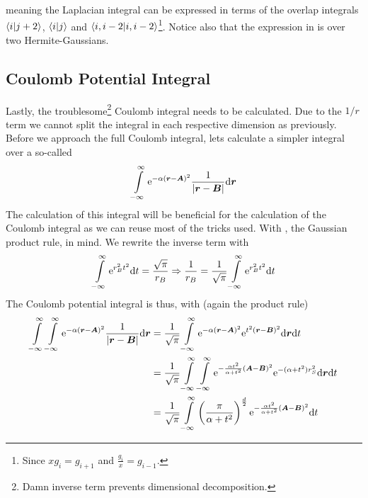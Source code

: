     meaning the Laplacian integral can be expressed in terms of the overlap
    integrals $\braket{i}{j+2}$, $\braket{i}{j}$ and
    $\braket{i,i-2}$\footnote{Since $xg_i=g_{i+1}$ and
    $\frac{g_i}{x}=g_{i-1}$.}. Notice also that the expression in
     is over two Hermite-Gaussians.

\subsection{Coulomb Potential Integral}
    Lastly, the troublesome\footnote{Damn inverse term prevents dimensional
    decomposition.} Coulomb integral needs to be calculated. Due to the $1/r$
    term we cannot split the integral in each respective dimension as
    previously. Before we approach the full Coulomb integral, lets calculate a
    simpler integral over a so-called 
        \begin{equation}
            \int\limits^{\infty}_{-\infty} \mathrm{e}^{-\alpha\left(\boldsymbol{{r}} - \boldsymbol{{A}}\right)^2}
            \frac{1}{\abs{\boldsymbol{{r}} - \boldsymbol{{B}}}} \mathrm{d}\boldsymbol{{r}}
        \end{equation}
    The calculation of this integral will be beneficial for the calculation of
    the Coulomb integral as we can reuse most of the tricks used. With
    , the Gaussian product rule, in mind. We
    rewrite the inverse term with
        \begin{equation}
            \int\limits^{\infty}_{-\infty} \mathrm{e}^{r^2_B t^2} \mathrm{d} t = \frac{\sqrt{\pi}}{r_B} \Rightarrow
            \frac{1}{r_B} = \frac{1}{\sqrt{\pi}} \int\limits^{\infty}_{-\infty} \mathrm{e}^{r^2_Bt^2} \mathrm{d} t
            \label{eq:onelectronTrick1}
        \end{equation}
    The Coulomb potential integral is thus, with
    (again the product rule)
        \begin{align}
            \int\limits^{\infty}_{-\infty}\int\limits^{\infty}_{-\infty} \mathrm{e}^{-\alpha\left(\boldsymbol{{r}} - \boldsymbol{{A}}\right)^2}
            \frac{1}{\abs{\boldsymbol{{r}} - \boldsymbol{{B}}}} \mathrm{d}\boldsymbol{{r}} &=
            \frac{1}{\sqrt{\pi}}\int\limits^{\infty}_{-\infty} \mathrm{e}^{-\alpha\left(\boldsymbol{{r}} -
            \boldsymbol{{A}}\right)^2} \mathrm{e}^{t^2(\boldsymbol{{r}} - \boldsymbol{{B}})^2} \mathrm{d}\boldsymbol{{r}} \mathrm{d}
            t \nonumber \\
            &= \frac{1}{\sqrt{\pi}} \int\limits^{\infty}_{-\infty}\int\limits^{\infty}_{-\infty} \mathrm{e}^{-\frac{\alpha
            t^2}{\alpha + t^2}\left(\boldsymbol{{A}} - \boldsymbol{{B}}\right)^2}
            \mathrm{e}^{-(\alpha+t^2)r^2_S} \mathrm{d}\boldsymbol{{r}} \mathrm{d} t \nonumber \\
            &= \frac{1}{\sqrt{\pi}} \int\limits^{\infty}_{-\infty} \left(\frac{\pi}{\alpha +
            t^2}\right)^{\frac{d}{2}} \mathrm{e}^{-\frac{\alpha t^2}{\alpha +
            t^2}\left(\boldsymbol{{A}} - \boldsymbol{{B}}\right)^2} \mathrm{d} t
            \label{eq:coulombPotentialIntegral}
        \end{align}
